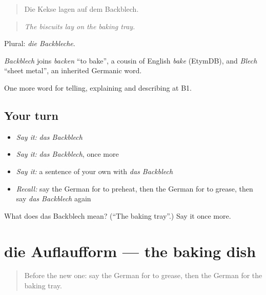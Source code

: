 \begin{quote}
Die Kekse lagen auf dem Backblech.
\end{quote}

\begin{quote}
\emph{The biscuits lay on the baking tray.}
\end{quote}

Plural: \emph{die Backbleche}.

\begin{cousinweb}
\emph{Backblech} joins \emph{backen} \textquotedblleft{}to bake\textquotedblright{}, a cousin of English \emph{bake} (EtymDB), and \emph{Blech} \textquotedblleft{}sheet metal\textquotedblright{}, an inherited Germanic word.
\end{cousinweb}

\begin{grammarlens}[title={What you've built}]
One more word for telling, explaining and describing at B1.
\end{grammarlens}

\subsection*{Your turn}
\begin{itemize}
\raggedright
  \item \emph{Say it:} \emph{das Backblech}
  \item \emph{Say it:} \emph{das Backblech}, once more
  \item \emph{Say it:} a sentence of your own with \emph{das Backblech}
  \item \emph{Recall:} say the German for to preheat, then the German for to grease, then say \emph{das Backblech} again
\end{itemize}

\begin{tcolorbox}[breakable,colback=teal!4,colframe=teal!35!black,title={Before you move on}]
What does das Backblech mean? (\textquotedblleft{}The baking tray\textquotedblright{}.) Say it once more.
\end{tcolorbox}
\section[die Auflaufform]{die Auflaufform — the baking dish}

\label{lesson:GE-C326-auflaufform}



\begin{quote}
Before the new one: say the German for to grease, then the German for the baking tray.
\end{quote}

